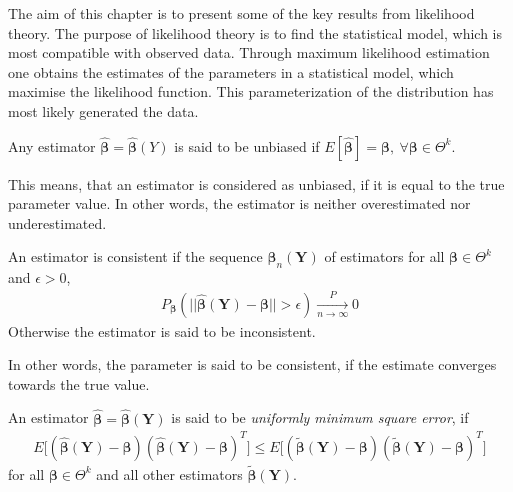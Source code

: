 The aim of this chapter is to present some of the key results from likelihood theory. 
The purpose of likelihood theory is to find the statistical model, which is most compatible with observed data. 
Through maximum likelihood estimation one obtains the estimates of the parameters in a statistical model, which maximise the likelihood function. 
This parameterization of the distribution has most likely generated the data. \\


\begin{definition} 
\label{def:Unbiased_estmator}
Any estimator $\boldsymbol{\hat{\beta}} = \boldsymbol{\hat{\beta}}(Y)$ is said to be unbiased if $E[\boldsymbol{\hat{\beta}}] = \boldsymbol{\beta}, \ \forall \boldsymbol{\beta} \in \Theta^k$.
\end{definition}

This means, that an estimator is considered as unbiased, if it is equal to the true parameter value. 
In other words, the estimator is neither overestimated nor underestimated.

\begin{definition} 
\label{def:consistent_estimator}
An estimator is consistent if the sequence $\boldsymbol{\beta}_n(\textbf{Y})$ of estimators for all $\boldsymbol{\beta} \in \Theta^k$ and $\epsilon > 0$,
\begin{align*}
    P_{\boldsymbol{\beta}}(||\hat{\boldsymbol{\beta}}(\textbf{Y}) - \boldsymbol{\beta}|| > \epsilon) \xrightarrow[n \rightarrow \infty]{P} 0
\end{align*}
Otherwise the estimator is said to be inconsistent. 
\end{definition}
In other words, the parameter is said to be consistent, if the estimate converges towards the true value. 

\begin{definition} 
\label{def:minimum_mean_square_error}
An estimator $\boldsymbol{\hat{\beta}}=\boldsymbol{\hat{\beta}}(\textbf{Y})$ is said to be \textit{uniformly minimum square error}, if
\begin{align*}
    E\big[ (\boldsymbol{\hat{\beta}}(\textbf{Y})-\boldsymbol{\beta})(\boldsymbol{\hat{\beta}}(\textbf{Y})-\boldsymbol{\beta})^T \big] \leq E\big[ (\boldsymbol{\tilde{\beta}}(\textbf{Y})-\boldsymbol{\beta})(\boldsymbol{\tilde{\beta}}(\textbf{Y})-\boldsymbol{\beta})^T \big]
\end{align*} 
for all $\boldsymbol{\beta} \in \Theta^k $ and all other estimators $\boldsymbol{\tilde{\beta}(\textbf{Y})}$.
 \end{definition}

